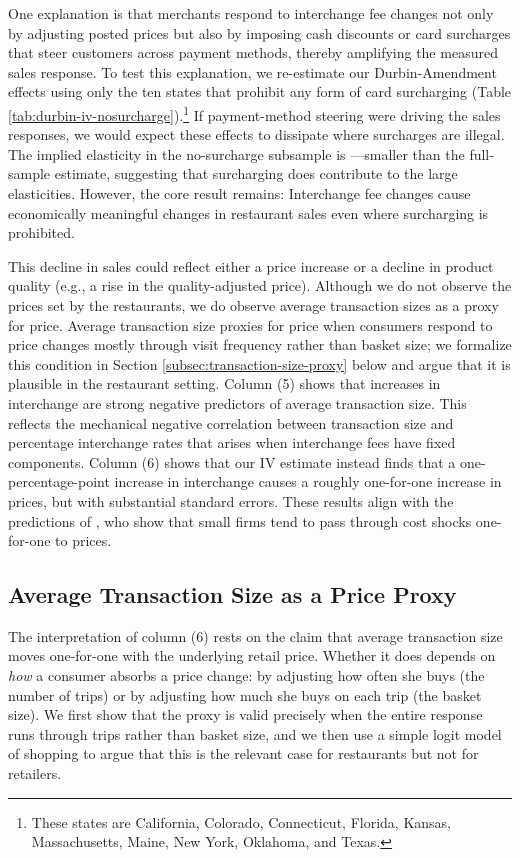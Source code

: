 \documentclass[main.tex]{subfiles}
\begin{document}
One explanation is that merchants respond to interchange fee changes not only by adjusting posted prices but also by imposing cash discounts or card surcharges that steer customers across payment methods, thereby amplifying the measured sales response.
To test this explanation, we re-estimate our Durbin-Amendment effects using only the ten states that prohibit any form of card surcharging (Table \ref{tab:durbin-iv-nosurcharge}).\footnote{These states are California, Colorado, Connecticut, Florida, Kansas, Massachusetts, Maine, New York, Oklahoma, and Texas.}
If payment-method steering were driving the sales responses, we would expect these effects to dissipate where surcharges are illegal.
The implied elasticity in the no-surcharge subsample is ---smaller than the full-sample estimate, suggesting that surcharging does contribute to the large elasticities.
However, the core result remains: Interchange fee changes cause economically meaningful changes in restaurant sales even where surcharging is prohibited.

This decline in sales could reflect either a price increase or a decline in product quality (e.g., a rise in the quality-adjusted price).
Although we do not observe the prices set by the restaurants, we do observe average transaction sizes as a proxy for price.
Average transaction size proxies for price when consumers respond to price changes mostly through visit frequency rather than basket size; we formalize this condition in Section \ref{subsec:transaction-size-proxy} below and argue that it is plausible in the restaurant setting.
Column (5) shows that increases in interchange are strong negative predictors of average transaction size.
This reflects the mechanical negative correlation between transaction size and percentage interchange rates that arises when interchange fees have fixed components.
Column (6) shows that our IV estimate instead finds that a one-percentage-point increase in interchange causes a roughly one-for-one increase in prices, but with substantial standard errors.
These results align with the predictions of \citet{Amiti.etal2019}, who show that small firms tend to pass through cost shocks one-for-one to prices.

\subsection{Average Transaction Size as a Price Proxy\label{subsec:transaction-size-proxy}}

The interpretation of column (6) rests on the claim that average transaction size moves one-for-one with the underlying retail price.
Whether it does depends on \emph{how} a consumer absorbs a price change: by adjusting how often she buys (the number of trips) or by adjusting how much she buys on each trip (the basket size).
We first show that the proxy is valid precisely when the entire response runs through trips rather than basket size, and we then use a simple logit model of shopping to argue that this is the relevant case for restaurants but not for retailers.
\end{document}
